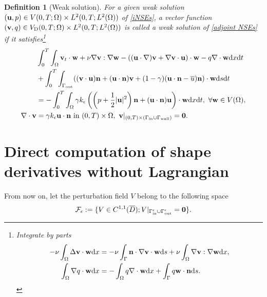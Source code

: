 \documentclass[oneside,11pt]{book}
\numberwithin{equation}{section}
\newtheorem{definition}{Definition}[section]
\begin{document}
\begin{definition}[Weak solution]
    For a given weak solution $({\bf u},p)\in V(0,T;\Omega)\times L^2(0,T;L^2(\Omega))$ of \eqref{iNSEs}, a vector function $({\bf v},q)\in V_{\rm D}(0,T;\Omega)\times L^2(0,T;L^2(\Omega))$ is called a \emph{weak solution} of \eqref{adjoint NSEs} if it satisfies\footnote{Integrate by parts
        \begin{align}
            -\nu\int_\Omega \Delta{\bf v}\cdot{\bf w}{\rm d}x &= -\nu\int_\Gamma {\bf n}\cdot\nabla{\bf v}\cdot{\bf w}{\rm d}s + \nu\int_\Omega \nabla{\bf v}:\nabla{\bf w}{\rm d}x,\\
            \int_\Omega \nabla q\cdot{\bf w}{\rm d}x &= -\int_\Omega q\nabla\cdot{\bf w}{\rm d}x + \int_\Gamma q{\bf w}\cdot{\bf n}{\rm d}s.
    \end{align}}
    \begin{align}
        \label{weak formulation adjoint insNSEs}
        &\int_0^T\int_\Omega {\bf v}_t\cdot{\bf w} + \nu\nabla{\bf v}:\nabla{\bf w} - (({\bf u}\cdot\nabla){\bf v} + \nabla{\bf v}\cdot{\bf u})\cdot{\bf w}  - q\nabla\cdot{\bf w}{\rm d}x{\rm d}t\\
        &+ \int_0^T\int_{\Gamma_{\rm out}} (({\bf v}\cdot{\bf u}){\bf n} + ({\bf u}\cdot{\bf n}){\bf v} + (1 - \gamma)({\bf u}\cdot{\bf n} - \overline{u}){\bf n})\cdot{\bf w}{\rm d}s{\rm d}t\\
        &= -\int_0^T\int_\Omega \gamma k_\epsilon\left(\left(p + \frac{1}{2}|{\bf u}|^2\right){\bf n} + ({\bf u}\cdot{\bf n}){\bf u}\right)\cdot{\bf w}{\rm d}x{\rm d}t,\ \forall{\bf w}\in V(\Omega),\\
        \nabla\cdot{\bf v} &= \gamma k_\epsilon{\bf u}\cdot{\bf n} \mbox{ in } (0,T)\times\Omega,\ {\bf v}|_{(0,T)\times(\Gamma_{\rm in}\cup\Gamma_{\rm wall})} = {\bf 0}.
    \end{align}
\end{definition}

\section{Direct computation of shape derivatives without Lagrangian}
From now on, let the perturbation field $V$ belong to the following space
\begin{align}
    \mathcal{F}_\epsilon := \{V\in C^{1,1}(\overline{D});V|_{\Gamma_{\rm in}^\epsilon\cup\Gamma_{\rm out}^\epsilon} = {\bf 0}\}.
\end{align}
\end{document}
